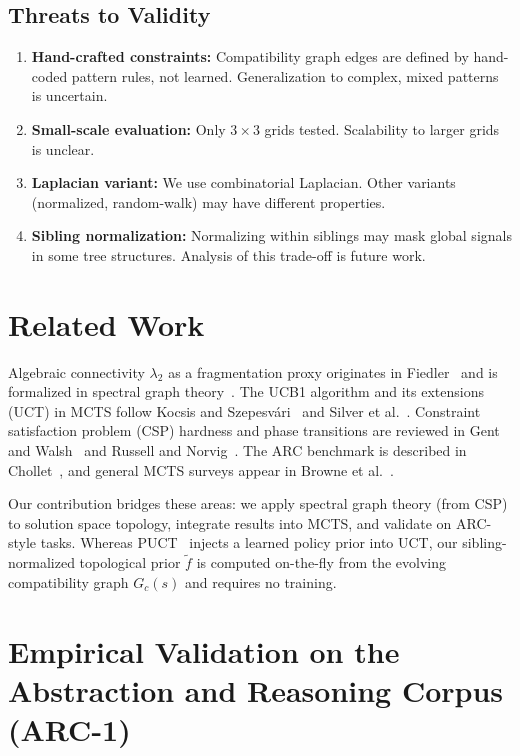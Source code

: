 \documentclass[11pt]{article}
\begin{document}
\subsection{Threats to Validity}

\begin{enumerate}
\item \textbf{Hand-crafted constraints:} Compatibility graph edges are defined by hand-coded pattern rules, not learned. Generalization to complex, mixed patterns is uncertain.

\item \textbf{Small-scale evaluation:} Only $3 \times 3$ grids tested. Scalability to larger grids is unclear.

\item \textbf{Laplacian variant:} We use combinatorial Laplacian. Other variants (normalized, random-walk) may have different properties.

\item \textbf{Sibling normalization:} Normalizing within siblings may mask global signals in some tree structures. Analysis of this trade-off is future work.
\end{enumerate}

\section{Related Work}

Algebraic connectivity $\lambda_2$ as a fragmentation proxy originates in Fiedler~\cite{Fiedler1973} and is formalized in spectral graph theory~\cite{Chung1997}. The UCB1 algorithm and its extensions (UCT) in MCTS follow Kocsis and Szepesv\'{a}ri~\cite{KocsisSzepesvari2006} and Silver et al.~\cite{Silver2017}. Constraint satisfaction problem (CSP) hardness and phase transitions are reviewed in Gent and Walsh~\cite{Gent1994} and Russell and Norvig~\cite{RusselNorvig2010}. The ARC benchmark is described in Chollet~\cite{Chollet2019}, and general MCTS surveys appear in Browne et al.~\cite{Browne2012}.

Our contribution bridges these areas: we apply spectral graph theory (from CSP) to solution space topology, integrate results into MCTS, and validate on ARC-style tasks. Whereas PUCT~\cite{Silver2017} injects a learned policy prior into UCT, our sibling-normalized topological prior $\widetilde{f}$ is computed on-the-fly from the evolving compatibility graph $G_c(s)$ and requires no training.

\section{Empirical Validation on the Abstraction and Reasoning Corpus (ARC-1)}
\label{sec:arc1}
\end{document}
